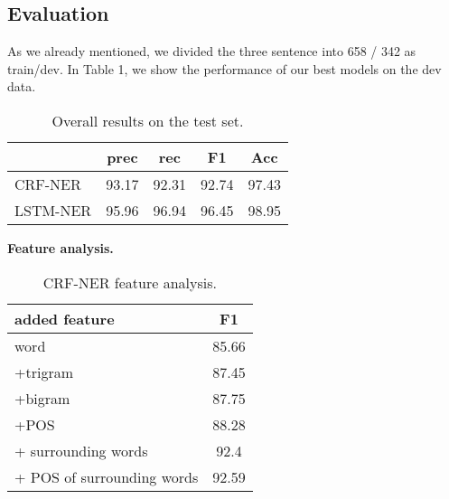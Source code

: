 \documentclass[11pt]{article}
\begin{document}
\subsection{Evaluation}
As we already mentioned, we divided
the three sentence into 658 / 342 as train/dev.
In Table 1, we show the performance of our best models on the dev data.
\begin{table}[ht]
\begin{center}
\begin{tabular}{l|c|c|c|c}
\hline 
& prec & rec & F1 & Acc\\ 
\hline 
CRF-NER  & 93.17 & 92.31 & 92.74 & 97.43\\ 
\hline 
LSTM-NER & 95.96 & 96.94 & 96.45 & 98.95\\ 

\hline 
\end{tabular} 
\caption{Overall results on the test set. }
\end{center}
\label{perf}
\end{table}

\textbf{Feature analysis.}

\begin{table}
\begin{center}
\begin{tabular}{l|c}
\hline 
added feature & F1 \\ 
\hline 
word     & 85.66 \\
+trigram & 87.45 \\
+bigram  & 87.75 \\
+POS  & 88.28 \\
+ surrounding words & 92.4 \\
+ POS of surrounding words & 92.59
\end{tabular} 
\caption{CRF-NER feature analysis.}
\end{center}
\label{perf}
\end{table}





\end{document}

